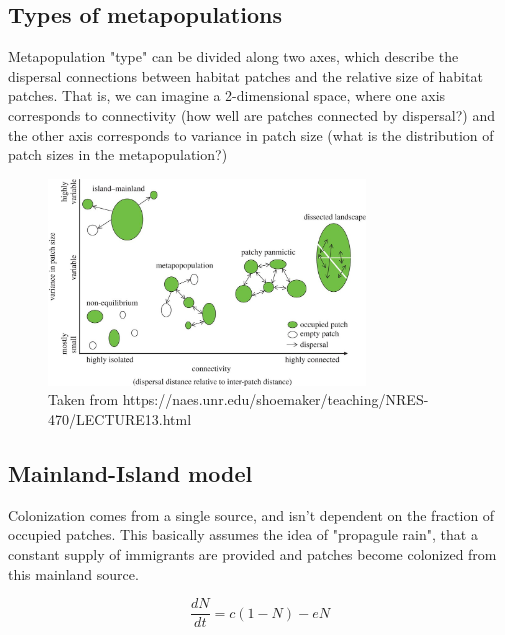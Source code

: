 \documentclass[12pt]{article}
\begin{document}
\bigskip

\subsection*{Types of metapopulations}

Metapopulation "type" can be divided along two axes, which describe the dispersal connections between habitat patches and the relative size of habitat patches. That is, we can imagine a 2-dimensional space, where one axis corresponds to connectivity (how well are patches connected by dispersal?) and the other axis corresponds to variance in patch size (what is the distribution of patch sizes in the metapopulation?) 


\begin{figure}

  \includegraphics[width=0.75\textwidth]{figs/MP1.jpg}
  \caption{Taken from https://naes.unr.edu/shoemaker/teaching/NRES-470/LECTURE13.html}

\end{figure}






\bigskip

\subsection*{Mainland-Island model}

Colonization comes from a single source, and isn't dependent on the fraction of occupied patches. This basically assumes the idea of "propagule rain", that a constant supply of immigrants are provided and patches become colonized from this mainland source.

\begin{equation}
\frac{dN}{dt} = c(1-N) - eN
\end{equation}
\end{document}
